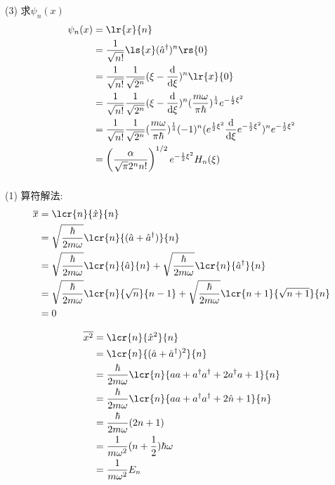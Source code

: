 \begin{frame}
    \frametitle{}
    (3) 求$\psi_n (x)$
    \[ 
      \begin{aligned}
        \psi_n (x) &= \lr{x}{n}  \\ 
        &=  \frac{1}{\sqrt{n!}}\ls{x} (\hat{a}^\dagger)^n \rs{0}   \\ 
        &=  \frac{1}{\sqrt{n!}}  \frac{1}{\sqrt{2^n}} (\xi - \frac{\mathrm{d} }{\mathrm{d}\xi} )^n \lr{x}{0}   \\ 
        &=  \frac{1}{\sqrt{n!}}  \frac{1}{\sqrt{2^n}} (\xi - \frac{\mathrm{d} }{\mathrm{d}\xi} )^n (\frac{m \omega }{\pi  \hbar})^{\frac{1}{4}}  e^{- \frac{1 }{2 } \xi^2}    \\ 
        &=  \frac{1}{\sqrt{n!}}  \frac{1}{\sqrt{2^n}} (\frac{m \omega }{\pi  \hbar})^{\frac{1}{4}} (-1)^n (  e ^{\frac{1}{2}\xi^2} \frac{\mathrm{d} }{\mathrm{d}\xi} e ^{-\frac{1}{2}\xi^2})^n  e^{- \frac{1 }{2 } \xi^2}  \\  
        &= \left( \frac{\alpha}{\sqrt{\pi} 2^n n!}  \right) ^{1/2} e^{- \frac{1 }{2 } \xi^2} H_n(\xi)  
      \end{aligned} \] 
\end{frame}

\begin{frame}
    \frametitle{}
    \证 (1) 算符解法: 
    \[\begin{aligned}
       \overline{x} & = \lcr{n}{\hat{x}}{n} \\ 
       &= \sqrt{\frac{\hbar}{2m\omega}} \lcr{n}{  (\hat{a}+ \hat{a}^\dagger)}{n} \\ 
       &= \sqrt{\frac{\hbar}{2m\omega}} \lcr{n}{  \hat{a}}{n} +  \sqrt{\frac{\hbar}{2m\omega}}\lcr{n}{ \hat{a}^\dagger}{n}  \\ 
       &= \sqrt{\frac{\hbar}{2m\omega}} \lcr{n}{  \sqrt{n}}{n-1} +\sqrt{\frac{\hbar}{2m\omega}} \lcr{n+1}{  \sqrt{n+1} }{n} \\ &=0  
   \end{aligned} \]     
   \end{frame}
   
   \begin{frame}
   \[\begin{aligned}
       \overline{x^2} & = \lcr{n}{\hat{x}^2}{n} \\ 
       &=  \lcr{n}{ (\hat{a}+ \hat{a}^\dagger)^2}{n} \\ 
       &= \frac{\hbar}{2m\omega} \lcr{n}{ aa + {a}^\dagger {a}^\dagger + 2{a}^\dagger a + 1}{n} \\ 
       &= \frac{\hbar}{2m\omega} \lcr{n}{ aa + {a}^\dagger {a}^\dagger + 2 \hat{n} + 1}{n} \\ 
       &= \frac{\hbar}{2m\omega} (2n+1)  \\ 
       &= \frac{1}{m\omega^2}  (n+\frac{1}{2})\hbar\omega \\ 
       &= \frac{1}{m\omega^2} E_n
   \end{aligned} \]     
   \end{frame}
   
